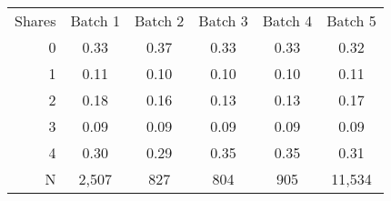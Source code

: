 
\begin{tabular}[t]{rccccc}
Shares & Batch 1 & Batch 2 & Batch 3 & Batch 4 & Batch 5\\
 \cmidrule(lr){2-2}  \cmidrule(lr){3-3}  \cmidrule(lr){4-4} \cmidrule(lr){5-5} \cmidrule(lr){6-6} 
0 & 0.33 & 0.37 & 0.33 & 0.33 & 0.32\\
1 & 0.11 & 0.10 & 0.10 & 0.10 & 0.11\\
2 & 0.18 & 0.16 & 0.13 & 0.13 & 0.17\\
3 & 0.09 & 0.09 & 0.09 & 0.09 & 0.09\\
4 & 0.30 & 0.29 & 0.35 & 0.35 & 0.31\\
N & 2,507 & 827 & 804 & 905 & 11,534
\end{tabular}
